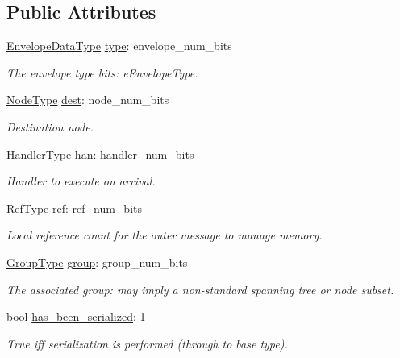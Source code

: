 \subsection*{Public Attributes}
\begin{DoxyCompactItemize}
\item 
\hyperlink{namespacevt_a2740126d59f361d9ba46f66b3b4b0d3d}{Envelope\+Data\+Type} \hyperlink{structvt_1_1messaging_1_1_active_envelope_aaa2cebe2e468e71249feff85841521d4}{type}\+: envelope\+\_\+num\+\_\+bits
\begin{DoxyCompactList}\small\item\em The envelope type bits\+: {\ttfamily e\+Envelope\+Type}. \end{DoxyCompactList}\item 
\hyperlink{namespacevt_a866da9d0efc19c0a1ce79e9e492f47e2}{Node\+Type} \hyperlink{structvt_1_1messaging_1_1_active_envelope_ad82d63430ef2ae4d03c1a986fa2f9350}{dest}\+: node\+\_\+num\+\_\+bits
\begin{DoxyCompactList}\small\item\em Destination node. \end{DoxyCompactList}\item 
\hyperlink{namespacevt_af64846b57dfcaf104da3ef6967917573}{Handler\+Type} \hyperlink{structvt_1_1messaging_1_1_active_envelope_a0d27da3b0da69281b7572ea29fcf61fc}{han}\+: handler\+\_\+num\+\_\+bits
\begin{DoxyCompactList}\small\item\em Handler to execute on arrival. \end{DoxyCompactList}\item 
\hyperlink{namespacevt_a9b39ce9494bb04674d0d5b895a5aa50f}{Ref\+Type} \hyperlink{structvt_1_1messaging_1_1_active_envelope_a61861e4316e9c65f7a18ba792da412e2}{ref}\+: ref\+\_\+num\+\_\+bits
\begin{DoxyCompactList}\small\item\em Local reference count for the outer message to manage memory. \end{DoxyCompactList}\item 
\hyperlink{namespacevt_a27b5e4411c9b6140c49100e050e2f743}{Group\+Type} \hyperlink{structvt_1_1messaging_1_1_active_envelope_a99173c33673ca13d681910bb07b9a7a0}{group}\+: group\+\_\+num\+\_\+bits
\begin{DoxyCompactList}\small\item\em The associated group\+: may imply a non-\/standard spanning tree or node subset. \end{DoxyCompactList}\item 
bool \hyperlink{structvt_1_1messaging_1_1_active_envelope_a340d6eae2a23ce99dc3e06f1ae2a5b81}{has\+\_\+been\+\_\+serialized}\+: 1
\begin{DoxyCompactList}\small\item\em True iff serialization is performed (through to base type). \end{DoxyCompactList}\end{DoxyCompactItemize}


